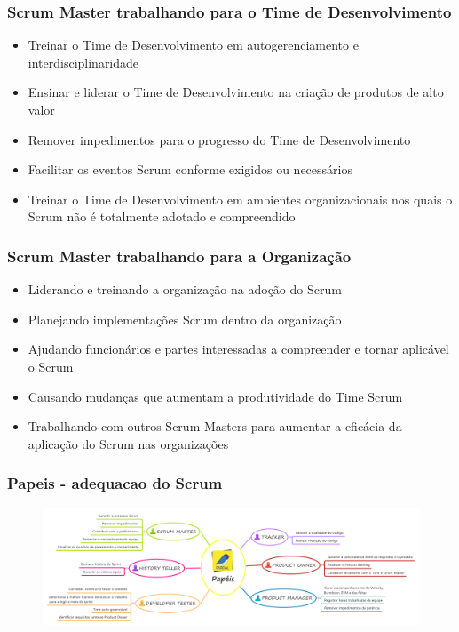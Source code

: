\begin{frame}
 \frametitle{Scrum Master trabalhando para o Time de Desenvolvimento}
 \begin{itemize}
  \item Treinar o Time de Desenvolvimento em autogerenciamento e interdisciplinaridade
  \item Ensinar e liderar o Time de Desenvolvimento na criação de produtos de alto valor
  \item Remover impedimentos para o progresso do Time de Desenvolvimento
  \item Facilitar os eventos Scrum conforme exigidos ou necessários
  \item Treinar o Time de Desenvolvimento em ambientes organizacionais nos quais o Scrum não é
totalmente adotado e compreendido
 \end{itemize}
\end{frame}

\begin{frame}
 \frametitle{Scrum Master trabalhando para a Organização}
 \begin{itemize}
  \item Liderando e treinando a organização na adoção do Scrum
  \item Planejando implementações Scrum dentro da organização
  \item Ajudando funcionários e partes interessadas a compreender e tornar aplicável o Scrum
  \item Causando mudanças que aumentam a produtividade do Time Scrum
  \item Trabalhando com outros Scrum Masters para aumentar a eficácia da aplicação do Scrum
nas organizações
 \end{itemize}
\end{frame}



\begin{frame}
 \frametitle{Papeis - adequacao do Scrum}
  \begin{figure}
   \centering
   \includegraphics[width = \textwidth]{figs/fig6.png}
  \end{figure}
\end{frame}

